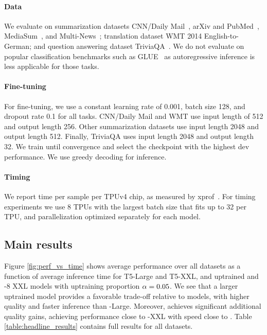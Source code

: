 \documentclass[11pt]{article}
\begin{document}
\paragraph{Data}
We evaluate on summarization datasets CNN/Daily Mail~\citep{cnn}, arXiv and PubMed~\citep{arxiv}, MediaSum~\citep{mediasum}, and Multi-News~\citep{multinews}; translation dataset WMT 2014  English-to-German; and question answering dataset TriviaQA~\citep{triviaqa}. We do not evaluate on popular classification benchmarks such as GLUE~\citep{glue} as autoregressive inference is less applicable for those tasks. 

\paragraph{Fine-tuning}

For fine-tuning, we use a constant learning rate of 0.001, batch size 128, and dropout rate 0.1 for all tasks. CNN/Daily Mail and WMT use input length of 512 and output length 256. Other summarization datasets use input length 2048 and output length 512. Finally, TriviaQA uses input length 2048 and output length 32. We train until convergence and select the checkpoint with the highest dev performance. We use greedy decoding for inference.

\paragraph{Timing}
We report time per sample per TPUv4 chip, as measured by xprof~\citep{xprof}. For timing experiments we use 8 TPUs with the largest batch size that fits up to 32 per TPU, and parallelization optimized separately for each model.


\subsection{Main results}

Figure \ref{fig:perf_vs_time} shows average performance over all datasets as a function of average inference time for \mh T5-Large and T5-XXL, and uptrained \mq and \gmq-$8$ XXL models with uptraining proportion $\alpha = 0.05$. We see that a larger uptrained \mq model provides a favorable trade-off relative to \mh models, with higher quality and faster inference than \mh-Large. Moreover, \gmq achieves significant additional quality gains, achieving performance close to \mh-XXL with speed close to \mq. Table \ref{table:headline_results} contains full results for all datasets.
\end{document}
